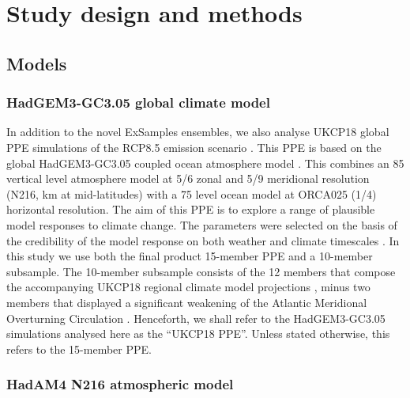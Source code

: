 \section{Study design and methods}

  \subsection{Models}
  
    \subsubsection{HadGEM3-GC3.05 global climate model}

      In addition to the novel ExSamples ensembles, we also analyse UKCP18 global PPE simulations of the RCP8.5 emission scenario \citep{riahi_rcp_2011}. This PPE is based on the global HadGEM3-GC3.05 coupled ocean atmosphere model \citep{murphy_ukcp18_2018,williams_met_2018}. This combines an 85 vertical level atmosphere model at 5/6\textdegree{} zonal and 5/9\textdegree{} meridional resolution (N216,  km at mid-latitudes) with a 75 level ocean model at ORCA025 (1/4\textdegree) horizontal resolution. The aim of this PPE is to explore a range of plausible model responses to climate change. The parameters were selected on the basis of the credibility of the model response on both weather and climate timescales \citep{karmalkar_finding_2019,sexton_finding_2019,sexton_perturbed_2021,yamazaki_perturbed_2021}. In this study we use both the final product 15-member PPE and a 10-member subsample. The 10-member subsample consists of the 12 members that compose the accompanying UKCP18 regional climate model projections \citep{murphy_ukcp18_2018}, minus two members that displayed a significant weakening of the Atlantic Meridional Overturning Circulation \citep{sexton_assessment_2020}. Henceforth, we shall refer to the HadGEM3-GC3.05 simulations analysed here as the ``UKCP18 PPE''. Unless stated otherwise, this refers to the 15-member PPE.
    
    \subsubsection{HadAM4 N216 atmospheric model}

